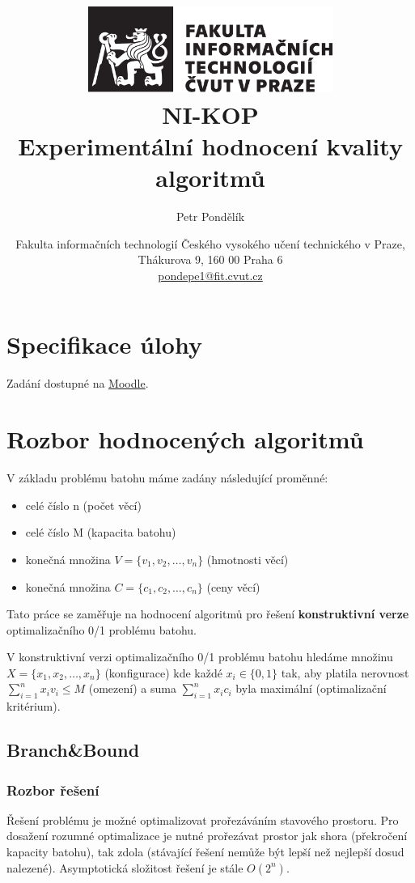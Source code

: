 \documentclass[12pt]{article}
\title{\includegraphics[width=8cm]{cvut-logo-bw.pdf}\\\vspace{2cm}NI-KOP \\ Experimentální hodnocení kvality algoritmů}
\author{\small Petr Pondělík} %
\date{\small Fakulta informačních technologií Českého vysokého učení technického v Praze, \\ Thákurova 9, 160 00 Praha 6 \\ \url{pondepe1@fit.cvut.cz}} %
\begin{document}
\maketitle              

\newpage

\section{Specifikace úlohy}

Zadání dostupné na \href{https://moodle-vyuka.cvut.cz/mod/assign/view.php?id=89700}{Moodle}.

\section{Rozbor hodnocených algoritmů}

V základu problému batohu máme zadány následující proměnné: 

\begin{itemize}
    \item celé číslo n (počet věcí)
    \item celé číslo M (kapacita batohu) 
    \item konečná množina \( V=\{v_1,v_2,…,v_n\} \) (hmotnosti věcí) 
    \item konečná množina \( C=\{c_1,c_2,…,c_n\} \) (ceny věcí)
\end{itemize}

Tato práce se zaměřuje na hodnocení algoritmů pro řešení \textbf{konstruktivní verze} optimalizačního 0/1 problému batohu.

V konstruktivní verzi optimalizačního 0/1 problému batohu hledáme množinu \( X=\{x_1,x_2,…,x_n\} \) (konfigurace) kde každé \( x_i \in \{0,1\} \) tak, aby platila nerovnost \( \sum_{i=1}^{n} x_i v_i \leq M \) (omezení) a suma \( \sum_{i=1}^{n} x_i c_i \) byla maximální (optimalizační kritérium).

\subsection{Branch\&Bound}

\subsubsection{Rozbor řešení}

Řešení problému je možné optimalizovat prořezáváním stavového prostoru. Pro dosažení rozumné optimalizace je nutné prořezávat prostor jak shora (překročení kapacity batohu), tak zdola (stávající řešení nemůže být lepší než nejlepší dosud nalezené). Asymptotická složitost řešení je stále $O(2^n)$.
\end{document}

